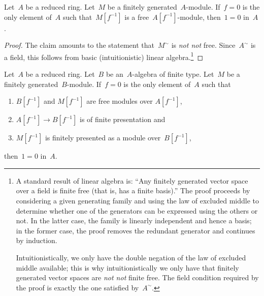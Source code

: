 \documentclass{ws-rv9x6}
\renewcommand{\_}{\mathpunct{.}}
\newcommand{\?}{\,{:}\,}
\newcommand{\notnot}{\emph{not not}\xspace}
\begin{document}
\begin{proposition}
\label{thm:baby-grothendieck}
Let~$A$ be a reduced ring. Let~$M$ be a finitely generated~$A$-module.
If~$f = 0$ is the only element of~$A$ such that~$M[f^{-1}]$ is a
free~$A[f^{-1}]$-module, then~$1 = 0$ in~$A$.
\end{proposition}

\begin{proof}The claim amounts to the statement that~$M^\sim$ is \emph{not not}
free. Since~$A^\sim$ is a field, this follows from
basic (intuitionistic) linear algebra.\footnote{A standard result of linear
algebra is: ``Any finitely generated vector space over a field is finite free
(that is, has a finite basis).'' The proof proceeds by considering a given
generating family and using the law of excluded middle to determine whether one
of the generators can be expressed using the others or not. In the latter case,
the family is linearly independent and hence a basis; in the former case, the
proof removes the redundant generator and continues by induction.

Intuitionistically, we only have the double negation of the law of excluded
middle available; this is why intuitionistically we only have that finitely
generated vector spaces are \notnot finite free. The field condition required
by the proof is exactly the one satisfied by~$A^\sim$.}\end{proof}

\begin{theorem}
Let~$A$ be a reduced ring. Let~$B$ be an~$A$-algebra of finite type. Let~$M$ be
a finitely generated~$B$-module.
If~$f = 0$ is the only element of~$A$ such that
\begin{enumerate}
\item $B[f^{-1}]$ and $M[f^{-1}]$ are free modules over $A[f^{-1}]$,
\item $A[f^{-1}] \to B[f^{-1}]$ is of finite presentation and
\item $M[f^{-1}]$ is finitely presented as a module over~$B[f^{-1}]$,
\end{enumerate}
then~$1 = 0$ in~$A$.
\end{theorem}
\end{document}
